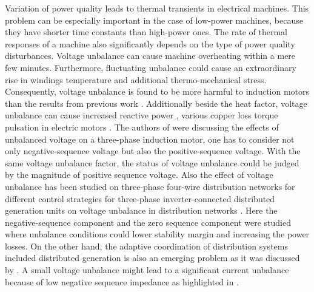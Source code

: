 \cite{paz2010system} Variation of power quality   leads to thermal transients in electrical machines. This problem can be especially important in the case of low-power machines, because they have shorter time constants than high-power ones. The rate of thermal responses of a machine also significantly depends on the type of power quality disturbances. Voltage unbalance can cause machine overheating within a mere few  minutes. Furthermore,  fluctuating  unbalance  could  cause  an  extraordinary rise in windings  temperature and additional  thermo-mechanical stress. Consequently, voltage unbalance is found to be more harmful to induction motors than the results from previous work \cite{gnacinski2019induction}. Additionally beside the heat factor, voltage unbalance can cause increased reactive power \cite{savaghebi2012secondary}, various copper loss \cite{siddique2004effects} torque pulsation in electric motors \cite{brekken2005control}. The authors of \cite{lee1998effects} were discussing the effects of unbalanced voltage on a three-phase induction motor, one has to consider not only negative-sequence voltage but also the positive-sequence voltage. With the same voltage unbalance factor, the status of voltage unbalance could be judged by the magnitude of positive sequence voltage. Also the effect of voltage unbalance has been studied on three-phase four-wire distribution networks for different control strategies for three-phase inverter-connected distributed generation units on voltage unbalance in distribution networks \cite{meersman2011three}. Here the negative-sequence component and the zero sequence component were studied where unbalance conditions could lower stability margin and increasing the power losses. On the other hand, the adaptive coordination of distribution systems included distributed generation is also an emerging problem as it was discussed by \cite{ates2016}.  A small voltage unbalance might lead to a significant current unbalance because of low negative sequence impedance as highlighted in \cite{bina2011three}.\\
